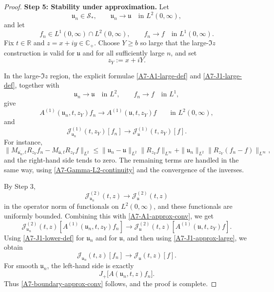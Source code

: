 \documentclass[10pt,a4paper]{amsart}
\begin{document}
\begin{proof}
\medskip
\noindent
\textbf{Step 5: Stability under approximation.}
Let
\[
\mathfrak u_n\in\mathcal S_*,
\qquad
\mathfrak u_n\to\mathfrak u
\quad\text{in }L^2(0,\infty),
\]
and let
\[
f_n\in L^1(0,\infty)\cap L^2(0,\infty),
\qquad
f_n\to f
\quad\text{in }L^1(0,\infty).
\]
Fix \(t\in\mathbb R\) and \(z=x+iy\in\mathbb C_+\). Choose \(Y\ge b\) so large
that the large-\(\Im z\) construction is valid for \(\mathfrak u\) and for all
sufficiently large \(n\), and set
\[
z_Y:=x+iY.
\]

In the large-\(\Im z\) region, the explicit formulae
\eqref{A7-A1-large-def} and \eqref{A7-J1-large-def}, together with
\[
\mathfrak u_n\to\mathfrak u
\quad\text{in }L^2,
\qquad
f_n\to f
\quad\text{in }L^1,
\]
give
\begin{equation}
\label{A7-A1-approx-conv}
A^{(1)}(\mathfrak u_n,t,z_Y)f_n
\longrightarrow
A^{(1)}(\mathfrak u,t,z_Y)f
\qquad\text{in }L^2(0,\infty),
\end{equation}
and
\begin{equation}
\label{A7-J1-approx-large}
\mathcal J^{(1)}_{\mathfrak u_n}(t,z_Y)[f_n]
\longrightarrow
\mathcal J^{(1)}_{\mathfrak u}(t,z_Y)[f].
\end{equation}
For instance,
\[
\|M_{\overline{\mathfrak u_n},t}R_{z_Y}f_n
-
M_{\overline{\mathfrak u},t}R_{z_Y}f\|_{L^2}
\le
\|\mathfrak u_n-\mathfrak u\|_{L^2}\|R_{z_Y}f\|_{L^\infty}
+
\|\mathfrak u_n\|_{L^2}\|R_{z_Y}(f_n-f)\|_{L^\infty},
\]
and the right-hand side tends to zero. The remaining terms are handled in the
same way, using \eqref{A7-Gamma-L2-continuity} and the convergence of the
inverses.

By Step 3,
\[
\mathcal J^{(2)}_{\mathfrak u_n}(t,z)
\to
\mathcal J^{(2)}_{\mathfrak u}(t,z)
\]
in the operator norm of functionals on \(L^2(0,\infty)\), and these functionals
are uniformly bounded. Combining this with \eqref{A7-A1-approx-conv}, we get
\[
\mathcal J^{(2)}_{\mathfrak u_n}(t,z)
\left[
A^{(1)}(\mathfrak u_n,t,z_Y)f_n
\right]
\to
\mathcal J^{(2)}_{\mathfrak u}(t,z)
\left[
A^{(1)}(\mathfrak u,t,z_Y)f
\right].
\]
Using \eqref{A7-J1-lower-def} for \(\mathfrak u_n\) and for \(\mathfrak u\), and
then using \eqref{A7-J1-approx-large}, we obtain
\[
\mathcal J_{\mathfrak u_n}(t,z)[f_n]
\to
\mathcal J_{\mathfrak u}(t,z)[f].
\]
For smooth \(\mathfrak u_n\), the left-hand side is exactly
\[
J_+\bigl[A(\mathfrak u_n,t,z)f_n\bigr].
\]
Thus \eqref{A7-boundary-approx-conv} follows, and the proof is complete.
\end{proof}
\end{document}
